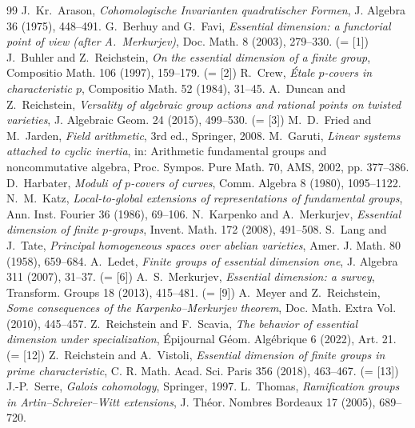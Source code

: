 \documentclass[11pt]{amsart}
\theoremstyle{definition}
\theoremstyle{remark}
\begin{document}
\pagestyle{myheadings}





\begin{thebibliography}{99}
\setcounter{enumiv}{16}
 J.~Kr.~Arason, \emph{Cohomologische Invarianten quadratischer Formen},
J. Algebra 36 (1975), 448--491.
 G.~Berhuy and G.~Favi, \emph{Essential dimension: a functorial point of
view (after A.~Merkurjev)}, Doc. Math. 8 (2003), 279--330. (= [1])
 J.~Buhler and Z.~Reichstein, \emph{On the essential dimension of a finite
group}, Compositio Math. 106 (1997), 159--179. (= [2])
 R.~Crew, \emph{\'Etale $p$-covers in characteristic $p$}, Compositio Math.
52 (1984), 31--45.
 A.~Duncan and Z.~Reichstein, \emph{Versality of algebraic group actions
and rational points on twisted varieties}, J. Algebraic Geom. 24 (2015), 499--530.
(= [3])
 M.~D.~Fried and M.~Jarden, \emph{Field arithmetic}, 3rd ed., Springer,
2008.
 M.~Garuti, \emph{Linear systems attached to cyclic inertia}, in:
Arithmetic fundamental groups and noncommutative algebra, Proc. Sympos. Pure Math. 70,
AMS, 2002, pp. 377--386.
 D.~Harbater, \emph{Moduli of $p$-covers of curves}, Comm. Algebra 8 (1980),
1095--1122.
 N.~M.~Katz, \emph{Local-to-global extensions of representations of
fundamental groups}, Ann. Inst. Fourier 36 (1986), 69--106.
 N.~Karpenko and A.~Merkurjev, \emph{Essential dimension of finite
$p$-groups}, Invent. Math. 172 (2008), 491--508.
 S.~Lang and J.~Tate, \emph{Principal homogeneous spaces over abelian
varieties}, Amer. J. Math. 80 (1958), 659--684.
 A.~Ledet, \emph{Finite groups of essential dimension one}, J. Algebra
311 (2007), 31--37. (= [6])
 A.~S.~Merkurjev, \emph{Essential dimension: a survey}, Transform. Groups
18 (2013), 415--481. (= [9])
 A.~Meyer and Z.~Reichstein, \emph{Some consequences of the
Karpenko--Merkurjev theorem}, Doc. Math. Extra Vol. (2010), 445--457.
 Z.~Reichstein and F.~Scavia, \emph{The behavior of essential dimension
under specialization}, \'Epijournal G\'eom. Alg\'ebrique 6 (2022), Art. 21. (= [12])
 Z.~Reichstein and A.~Vistoli, \emph{Essential dimension of finite groups
in prime characteristic}, C. R. Math. Acad. Sci. Paris 356 (2018), 463--467. (= [13])
 J.-P.~Serre, \emph{Galois cohomology}, Springer, 1997.
 L.~Thomas, \emph{Ramification groups in Artin--Schreier--Witt extensions},
J. Th\'eor. Nombres Bordeaux 17 (2005), 689--720.
\end{thebibliography}
\end{document}
